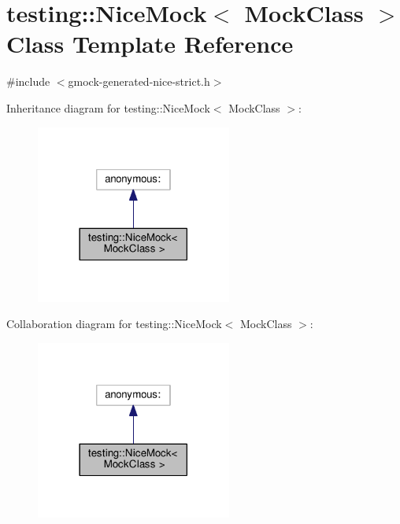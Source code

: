 \hypertarget{classtesting_1_1_nice_mock}{}\section{testing\+:\+:Nice\+Mock$<$ Mock\+Class $>$ Class Template Reference}
\label{classtesting_1_1_nice_mock}


{\ttfamily \#include $<$gmock-\/generated-\/nice-\/strict.\+h$>$}



Inheritance diagram for testing\+:\+:Nice\+Mock$<$ Mock\+Class $>$\+:
\nopagebreak
\begin{figure}[H]
\begin{center}
\leavevmode
\includegraphics[width=182pt]{classtesting_1_1_nice_mock__inherit__graph}
\end{center}
\end{figure}


Collaboration diagram for testing\+:\+:Nice\+Mock$<$ Mock\+Class $>$\+:
\nopagebreak
\begin{figure}[H]
\begin{center}
\leavevmode
\includegraphics[width=182pt]{classtesting_1_1_nice_mock__coll__graph}
\end{center}
\end{figure}
